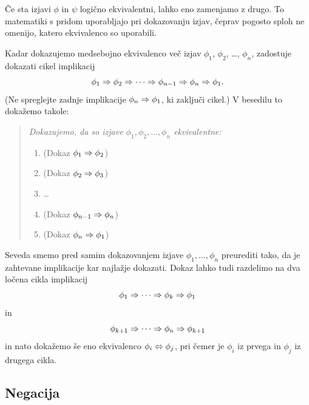 Če sta izjavi $\phi$ in $\psi$ logično ekvivalentni, lahko eno
zamenjamo z drugo. To matematiki s pridom uporabljajo pri dokazovanju
izjav, čeprav pogosto sploh ne omenijo, katero ekvivalenco so
uporabili.

Kadar dokazujemo medsebojno ekvivalenco več izjav $\phi_1$,
$\phi_2$, \ldots, $\phi_n$, zadostuje dokazati cikel implikacij
%
\begin{equation*}
  \phi_1 \Rightarrow \phi_2 \Rightarrow \cdots \Rightarrow \phi_{n-1} \Rightarrow \phi_n \Rightarrow \phi_1.
\end{equation*}
%
(Ne spreglejte zadnje implikacije $\phi_n \Rightarrow \phi_1$, ki zaključi
cikel.) V besedilu to dokažemo takole:

\begin{quote}
  \it
  Dokazujemo, da so izjave $\phi_1, \phi_2, \ldots, \phi_n$
  ekvivalentne:
  \begin{enumerate}
  \item (Dokaz $\phi_1 \Rightarrow \phi_2$)
  \item (Dokaz $\phi_2 \Rightarrow \phi_3$)
  \item \dots
  \item (Dokaz $\phi_{n-1} \Rightarrow \phi_n$)
  \item (Dokaz $\phi_n \Rightarrow \phi_1$)
  \end{enumerate}
\end{quote}

\noindent
%
Seveda smemo pred samim dokazovanjem izjave $\phi_1, \ldots, \phi_n$
preurediti tako, da je zahtevane implikacije kar najlažje dokazati.
Dokaz lahko tudi razdelimo na dva ločena cikla implikacij
%
\begin{equation*}
  \phi_1 \Rightarrow \cdots \Rightarrow \phi_k \Rightarrow \phi_1
\end{equation*}
%
in
%
\begin{equation*}
  \phi_{k+1} \Rightarrow \cdots \Rightarrow \phi_n \Rightarrow \phi_{k+1}
\end{equation*}
%
in nato dokažemo še eno ekvivalenco $\phi_i \Leftrightarrow \phi_j$, pri čemer
je $\phi_i$ iz prvega in $\phi_j$ iz drugega cikla.

\subsection{Negacija}

\label{sec:negacija}

